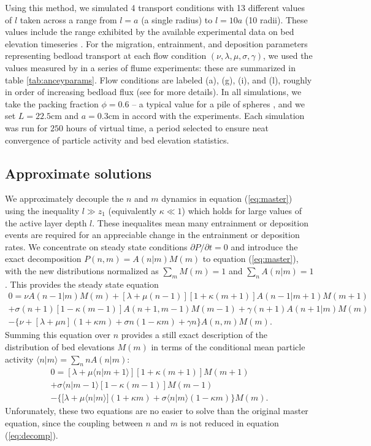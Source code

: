 \documentclass[draft]{agujournal2018}
\begin{document}
Using this method, we simulated 4 transport conditions with 13 different values of $l$ taken across a range from $l=a$ (a single radius) to $l=10a$ (10 radii).
These values include the range exhibited by the available experimental data on bed elevation timeseries \citep{Wong2007,Singh2009,Martin2014}.
For the migration, entrainment, and deposition parameters representing bedload transport at each flow condition $(\nu, \lambda, \mu, \sigma, \gamma)$, we used the values measured by \citet{Ancey2008} in a series of flume experiments: these are summarized in table \ref{tab:anceyparams}.
Flow conditions are labeled (a), (g), (i), and (l), roughly in order of increasing bedload flux (see \citet{Ancey2008} for more details). 
In all simulations, we take the packing fraction $\phi = 0.6$ -- a typical value for a pile of spheres \citep[e.g.,][]{Bennett1972}, and we set $L = 22.5$cm and $a = 0.3$cm in accord with the \citet{Ancey2008} experiments.
Each simulation was run for $250$ hours of virtual time, a period selected to ensure neat convergence of particle activity and bed elevation statistics.

\subsection{Approximate solutions}
\label{sec:analytical}

We approximately decouple the $n$ and $m$ dynamics in equation (\ref{eq:master}) using the inequality $l \gg z_1$ (equivalently $\kappa \ll 1$) which holds for large values of the active layer depth $l$. These inequalites mean many entrainment or deposition events are required for an appreciable change in the entrainment or deposition rates.
We concentrate on steady state conditions $\partial P/\partial t = 0$ and introduce the exact decomposition $P(n,m) = A(n|m)M(m)$ to equation (\ref{eq:master}), with the new distributions normalized as $\sum_m M(m)=1$ and $\sum_n A(n|m)=1$.
This provides the steady state equation
\begin{multline}
 0 =  
\nu A(n-1|m)M(m) + [\lambda + \mu(n-1)][1+\kappa(m+1)]A(n-1|m+1)M(m+1)\\  
+ \sigma(n+1)[1-\kappa(m-1)]A(n+1,m-1)M(m-1) + \gamma(n+1)A(n+1|m)M(m) \\
- 
\{ \nu + [\lambda+ \mu n ](1+\kappa m) +  \sigma n ( 1- \kappa m) + \gamma n \}A(n,m)M(m).
\label{eq:decomp}
\end{multline}
Summing this equation over $n$ provides a still exact description of the distribution of bed elevations $M(m)$ in terms of the conditional mean particle activity $\langle n | m \rangle = \sum_{n}nA(n|m)$:
\begin{multline}
 0 =  [\lambda + \mu\langle n | m+1\rangle][1+\kappa(m+1)]M(m+1)
\\+ \sigma\langle n | m-1\rangle[1-\kappa(m-1)]M(m-1) \\
- 
\{  [\lambda+ \mu \langle n | m\rangle ](1+\kappa m) +  \sigma  \langle n | m\rangle( 1- \kappa m) \}M(m).
\label{eq:approxele}
\end{multline}
Unforunately, these two equations are no easier to solve than the original master equation, since the coupling between $n$ and $m$ is not reduced in equation (\ref{eq:decomp}).
\end{document}
